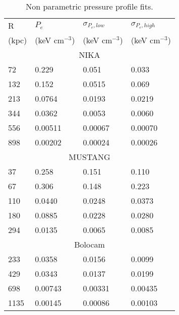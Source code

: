 \begin{table}[h]
  \caption{\footnotesize{Non parametric pressure profile fits.}}
  \begin{center}
    \begin{tabular}{l|lll}
      R     & $P_e$          & $\sigma_{P_e,low}$ & $\sigma_{P_e,high}$ \\
      (kpc) & (keV cm$^{-3}$) & (keV cm$^{-3}$)   & (keV cm$^{-3}$)   \\
      \hline
      \multicolumn{4}{c}{NIKA} \\
      \hline
      72  &  0.229 & 0.051  & 0.033       \\
      132 &  0.152 &  0.0515  & 0.069      \\
      213 &  0.0764 &  0.0193  & 0.0219    \\
      344 &  0.0362 &  0.0053  & 0.0060    \\
      556 &  0.00511 &  0.00067  & 0.00070  \\
      898 &  0.00202 &  0.00024  & 0.00026  \\
      \hline
      
      \multicolumn{4}{c}{MUSTANG} \\
      \hline
      37  & 0.258 &  0.151  & 0.110       \\
      67  & 0.306 &  0.148  & 0.223       \\
      110 & 0.0440 &  0.0248  & 0.0373     \\
      180 & 0.0885 &  0.0228  & 0.0280     \\
      294 & 0.0135 &  0.0065  & 0.0085     \\
      \hline
      
      \multicolumn{4}{c}{Bolocam} \\
      \hline
      233  & 0.0358 & 0.0156  & 0.0099     \\
      429  & 0.0343 & 0.0137  & 0.0199     \\
      698  & 0.00743 & 0.00331  & 0.00435  \\
      1135 & 0.00145 & 0.00086  & 0.00103  \\
      \hline
    \end{tabular}
  \end{center}
  \label{tbl:nppp_res}
\end{table}

